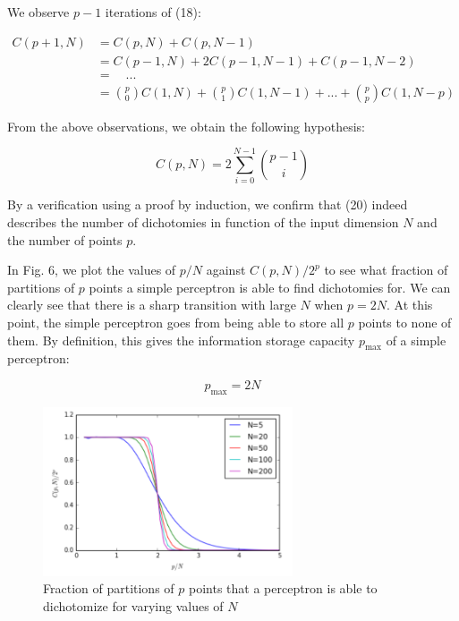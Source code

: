 We observe $p-1$ iterations of (18):

\begin{equation}
    \begin{split}
    C(p+1, N)
    & = C(p, N) + C(p, N-1) \\
    & = C(p-1, N) + 2 C(p-1, N-1) + C(p-1, N-2) \\
    & = \quad ... \\
    & = \binom{p}{0} C(1, N) + \binom{p}{1} C(1, N-1) + ... + \binom{p}{p} C(1, N-p) \end{split}
\end{equation}

From the above observations, we obtain the following hypothesis:

\begin{equation}
    C(p, N) = 2 \sum_{i=0}^{N-1} \binom{p-1}{i}
\end{equation}

By a verification using a proof by induction, we confirm that (20) indeed describes the number of dichotomies in function of the input dimension $N$ and the number of points $p$.

In Fig. 6, we plot the values of $p/N$ against $C(p, N)/2^p$ to see what fraction of partitions of $p$ points a simple perceptron is able to find dichotomies for. We can clearly see that there is a sharp transition with large $N$ when $p = 2N$. At this point, the simple perceptron goes from being able to store all $p$ points to none of them. By definition, this gives the information storage capacity $p_{\max}$ of a simple perceptron:

\begin{equation}
    p_{\max} = 2N
\end{equation}

\pagebreak

\begin{figure}[thbp]
    \centering
    \captionsetup{justification=centering, font=small, margin=0.5cm}
    \includegraphics[height=5cm]{images/capacity-graph.png}
    \caption{Fraction of partitions of $p$ points that a perceptron is able to dichotomize for varying values of $N$}
\end{figure}
